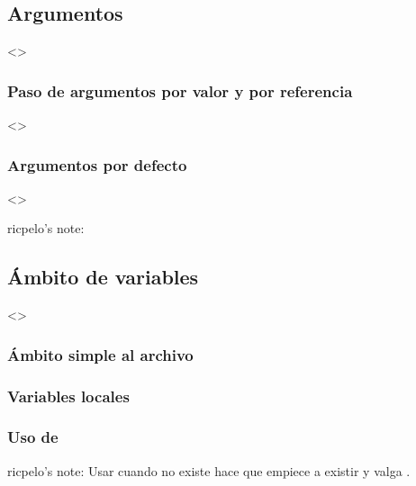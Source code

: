 \documentclass[a4paper,12pt,spanish]{sphinxmanual}
\begin{document}
\subsection{Argumentos}
\label{\detokenize{php:argumentos}}
\textless{}\textgreater{}


\subsubsection{Paso de argumentos por valor y por referencia}
\label{\detokenize{php:paso-de-argumentos-por-valor-y-por-referencia}}
\textless{}\textgreater{}


\subsubsection{Argumentos por defecto}
\label{\detokenize{php:argumentos-por-defecto}}
\textless{}\textgreater{}

ricpelo’s note:


\subsection{Ámbito de variables}
\label{\detokenize{php:ambito-de-variables}}
\textless{}\textgreater{}


\subsubsection{Ámbito simple al archivo}
\label{\detokenize{php:ambito-simple-al-archivo}}

\subsubsection{Variables locales}
\label{\detokenize{php:variables-locales}}

\subsubsection{Uso de }
\label{\detokenize{php:uso-de-global}}
ricpelo’s note: Usar  cuando  no existe hace que
 empiece a existir y valga .
\end{document}
